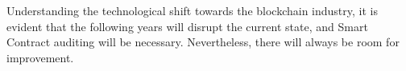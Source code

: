 \documentclass[a4paper,11pt]{article}
\begin{document}
Understanding the technological shift towards the blockchain industry, it is
evident that the following years will disrupt the current state, and Smart
Contract auditing will be necessary. Nevertheless, there will always be room for
improvement.



\small

\end{document}
